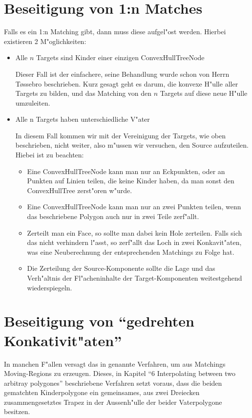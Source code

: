 \section{Beseitigung von 1:n Matches}

Falls es ein 1:n Matching gibt, dann muss diese aufgel"ost werden. Hierbei existieren 2 M"oglichkeiten:
\begin{itemize}
\item Alle $n$ Targets sind Kinder einer einzigen ConvexHullTreeNode

Dieser Fall ist der einfachere, seine Behandlung wurde schon von Herrn T\o{}ssebro beschrieben. Kurz gesagt geht es darum, die konvexe H"ulle aller Targets zu bilden, und das Matching von den $n$ Targets auf diese neue H"ulle umzuleiten.

\item Alle n Targets haben unterschiedliche V"ater

In diesem Fall kommen wir mit der Vereinigung der Targets, wie oben beschrieben, nicht weiter, also m"ussen wir versuchen, den Source aufzuteilen. Hiebei ist zu beachten:
\begin{itemize}
\item Eine ConvexHullTreeNode kann man nur an Eckpunkten, oder an Punkten auf Linien teilen, die keine Kinder haben, da man sonst den ConvexHullTree zerst"oren w"urde.

\item Eine ConvexHullTreeNode kann man nur an zwei Punkten teilen, wenn das beschriebene Polygon auch nur in zwei Teile zerf"allt.
\item Zerteilt man ein Face, so sollte man dabei kein Hole zerteilen. Falls sich das nicht verhindern l"asst, so zerf"allt das Loch in zwei Konkavit"aten, was eine Neuberechnung der entsprechenden Matchings zu Folge hat.

\item Die Zerteilung der Source-Komponente sollte die Lage und das Verh"altnis der Fl"acheninhalte der Target-Komponenten weitestgehend wiederspiegeln.

\end{itemize} 
\end{itemize} 
\section{Beseitigung von "`gedrehten Konkativit"aten"'}
In manchen F"allen versagt das in \cite{TG} genannte Verfahren, um aus Matchings Moving-Regions zu erzeugen. Dieses, in Kapitel "`6 Interpolating between two arbitray polygones"' beschriebene Verfahren setzt voraus, dass die beiden gematchten Kinderpolygone ein gemeinsames, aus zwei Dreiecken zusammengesetztes Trapez in der Aussenh"ulle der beider Vaterpolygone besitzen. 

